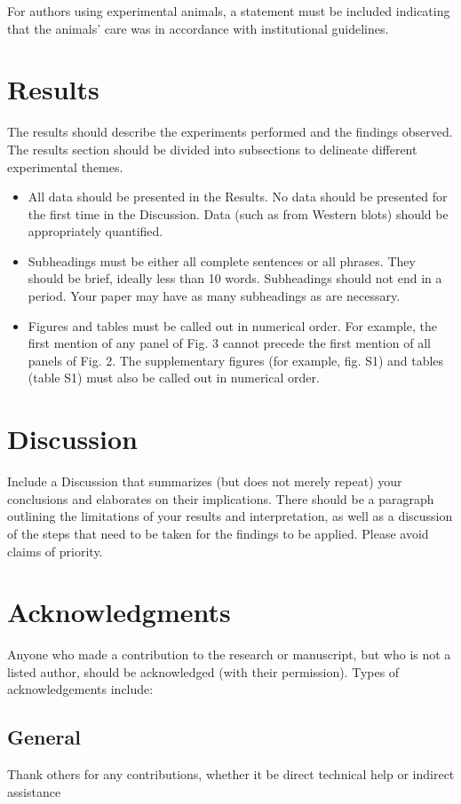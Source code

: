 \documentclass{article}
\begin{document}
For authors using experimental animals, a statement must be included indicating that the animals’ care was in 
accordance with institutional guidelines.

\section{Results}
The results should describe the experiments performed and the findings observed. The results section should be 
divided into subsections to delineate different experimental themes. 
\begin{itemize}
    \item All data should be presented in the Results. No data should be presented for the first time in the Discussion. Data (such as from Western blots) should be appropriately quantified.
    \item Subheadings must be either all complete sentences or all phrases. They should be brief, ideally less than 10 words. Subheadings should not end in a period. Your paper may have as many subheadings as are necessary.
    \item Figures and tables must be called out in numerical order. For example, the first mention of any panel of Fig. 3 cannot precede the first mention of all panels of Fig. 2. The supplementary figures (for example, fig. S1) and tables (table S1) must also be called out in numerical order. 
\end{itemize}

\section{Discussion}
Include a Discussion that summarizes (but does not merely repeat) your conclusions and elaborates on their implications. There should be a paragraph outlining the limitations of your results and interpretation, as well as a discussion of the steps that need to be taken for the findings to be applied. Please avoid claims of priority. 

\section*{Acknowledgments}
Anyone who made a contribution to the research or manuscript, but who is not a listed author, should be acknowledged (with their permission). Types of acknowledgements include:

\subsection{General} 
Thank others for any contributions, whether it be direct technical help or indirect assistance 
\end{document}
